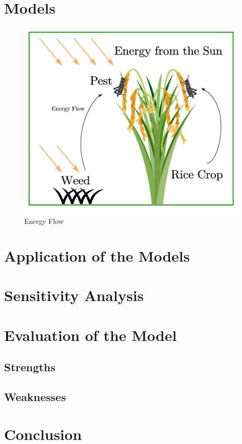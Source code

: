 \documentclass{HZNUMCM}
\begin{document}
  \section{Models}
    \begin{figure}[ht]
      \centering
      \includegraphics[width=0.5\linewidth]{images/energy_flow.png} %
      \caption{Energy Flow}
      \label{fig:EnergyFlow}
    \end{figure}

  \section{Application of the Models}

  \section{Sensitivity Analysis}

  \section{Evaluation of the Model}
    \subsection{Strengths}
    \subsection{Weaknesses}

  \section{Conclusion}

\end{document}

